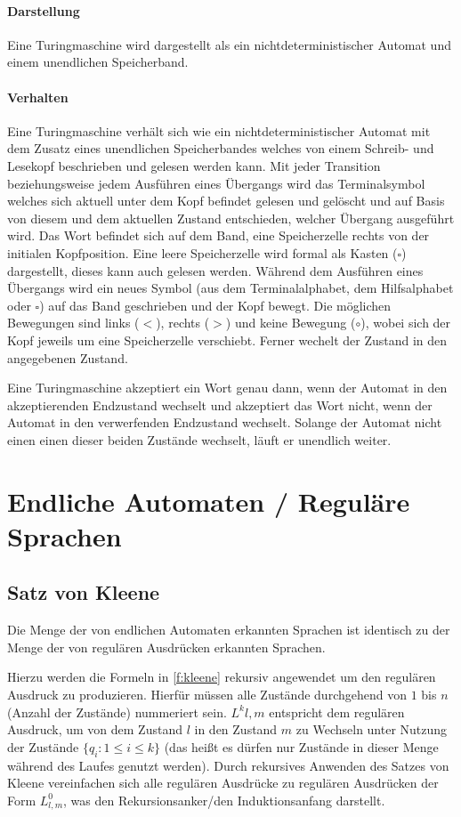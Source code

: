\paragraph{Darstellung}
Eine Turingmaschine wird dargestellt als ein nichtdeterministischer Automat und einem unendlichen Speicherband.

\paragraph{Verhalten}
Eine Turingmaschine verhält sich wie ein nichtdeterministischer Automat mit dem Zusatz eines unendlichen Speicherbandes welches von einem Schreib- und Lesekopf beschrieben und gelesen werden kann. Mit jeder Transition beziehungsweise jedem Ausführen eines Übergangs wird das Terminalsymbol welches sich aktuell unter dem Kopf befindet gelesen und gelöscht und auf Basis von diesem und dem aktuellen Zustand entschieden, welcher Übergang ausgeführt wird. Das Wort befindet sich auf dem Band, eine Speicherzelle rechts von der initialen Kopfposition. Eine leere Speicherzelle wird formal als Kasten ($ \square $) dargestellt, dieses kann auch gelesen werden. Während dem Ausführen eines Übergangs wird ein neues Symbol (aus dem Terminalalphabet, dem Hilfsalphabet oder $ \square $) auf das Band geschrieben und der Kopf bewegt. Die möglichen Bewegungen sind links ($ < $), rechts ($ > $) und keine Bewegung ($ \circ $), wobei sich der Kopf jeweils um eine Speicherzelle verschiebt. Ferner wechelt der Zustand in den angegebenen Zustand.

Eine Turingmaschine akzeptiert ein Wort genau dann, wenn der Automat in den akzeptierenden Endzustand wechselt und akzeptiert das Wort nicht, wenn der Automat in den verwerfenden Endzustand wechselt. Solange der Automat nicht einen einen dieser beiden Zustände wechselt, läuft er unendlich weiter.


\section{Endliche Automaten / Reguläre Sprachen}
\subsection{Satz von Kleene}
Die Menge der von endlichen Automaten erkannten Sprachen ist identisch zu der Menge der von regulären Ausdrücken erkannten Sprachen.

Hierzu werden die Formeln in \ref{f:kleene} rekursiv angewendet um den regulären Ausdruck zu produzieren. Hierfür müssen alle Zustände durchgehend von $ 1 $ bis $ n $ (Anzahl der Zustände) nummeriert sein. $ L ^ k  { l, m } $ entspricht dem regulären Ausdruck, um von dem Zustand $ l $ in den Zustand $ m $ zu Wechseln unter Nutzung der Zustände $ \{ q _ i : 1 \leq i \leq k \} $ (das heißt es dürfen nur Zustände in dieser Menge während des Laufes genutzt werden). Durch rekursives Anwenden des Satzes von Kleene vereinfachen sich alle regulären Ausdrücke zu regulären Ausdrücken der Form $ L ^ 0 _ { l, m } $, was den Rekursionsanker/den Induktionsanfang darstellt.

